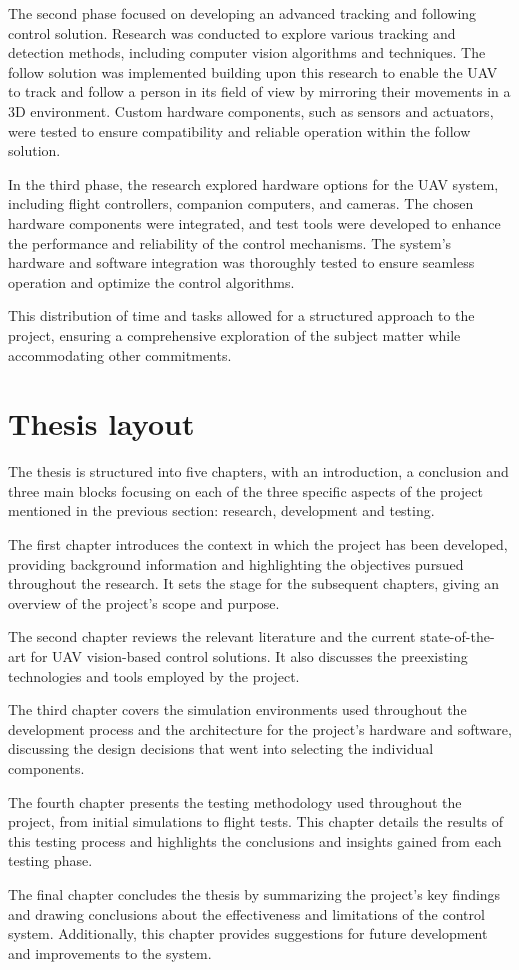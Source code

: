 The second phase focused on developing an advanced tracking and following control solution. Research was conducted to explore various tracking and detection methods, including computer vision algorithms and techniques. The follow solution was implemented building upon this research to enable the UAV to track and follow a person in its field of view by mirroring their movements in a 3D environment. Custom hardware components, such as sensors and actuators, were tested to ensure compatibility and reliable operation within the follow solution.

In the third phase, the research explored hardware options for the UAV system, including flight controllers, companion computers, and cameras. The chosen hardware components were integrated, and test tools were developed to enhance the performance and reliability of the control mechanisms. The system's hardware and software integration was thoroughly tested to ensure seamless operation and optimize the control algorithms.

This distribution of time and tasks allowed for a structured approach to the project, ensuring a comprehensive exploration of the subject matter while accommodating other commitments.

\section{Thesis layout}
\label{sec:layout}


The thesis is structured into five chapters, with an introduction, a conclusion and three main blocks focusing on each of the three specific aspects of the project mentioned in the previous section: research, development and testing. 

The first chapter introduces the context in which the project has been developed, providing background information and highlighting the objectives pursued throughout the research. It sets the stage for the subsequent chapters, giving an overview of the project's scope and purpose.

The second chapter reviews the relevant literature and the current state-of-the-art for UAV vision-based control solutions. It also discusses the preexisting technologies and tools employed by the project.

The third chapter covers the simulation environments used throughout the development process and the architecture for the project's hardware and software, discussing the design decisions that went into selecting the individual components.

The fourth chapter presents the testing methodology used throughout the project, from initial simulations to flight tests. This chapter details the results of this testing process and highlights the conclusions and insights gained from each testing phase.

The final chapter concludes the thesis by summarizing the project's key findings and drawing conclusions about the effectiveness and limitations of the control system. Additionally, this chapter provides suggestions for future development and improvements to the system.
